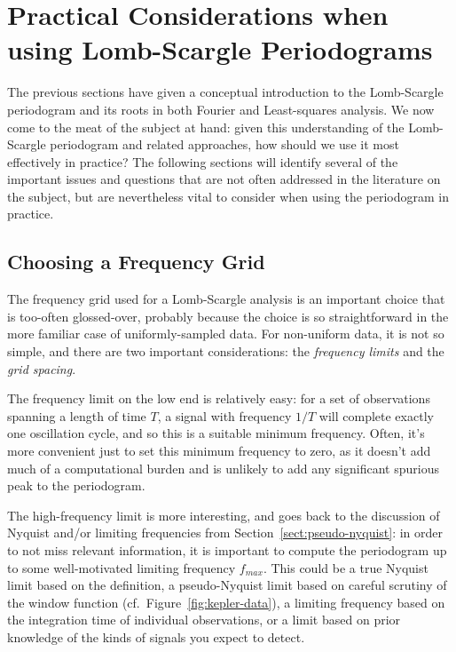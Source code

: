 \documentclass[preprint]{aastex}
\newcommand{\fig}[1]{Figure~\ref{fig:#1}}
\newcommand{\Sect}[1]{Section~\ref{sect:#1}}
\newcommand{\sect}[1]{\Sect{#1}}
\newcommand{\sectlabel}[1]{\label{sect:#1}}
\begin{document}
\section{Practical Considerations when using Lomb-Scargle Periodograms}
\sectlabel{practical-considerations}
The previous sections have given a conceptual introduction to the Lomb-Scargle
periodogram and its roots in both Fourier and Least-squares analysis.
We now come to the meat of the subject at hand:
given this understanding of the Lomb-Scargle periodogram and related
approaches, how should we use it most effectively in practice?
The following sections will identify several of the important issues and
questions that are not often addressed in the literature on the subject,
but are nevertheless vital to consider when using the periodogram in practice.

\subsection{Choosing a Frequency Grid}
\sectlabel{frequency-grid}
The frequency grid used for a Lomb-Scargle analysis is an important choice
that is too-often glossed-over, probably because the choice is so
straightforward in the more familiar case of uniformly-sampled data.
For non-uniform data, it is not so simple, and there are two important
considerations: the {\it frequency limits} and the {\it grid spacing}.

The frequency limit on the low end is relatively easy: for a set of observations
spanning a length of time $T$,
a signal with frequency $1/T$ will complete exactly one oscillation cycle,
and so this is a suitable minimum frequency.
Often, it's more convenient just to set this minimum frequency to zero, as it
doesn't add much of a computational burden and is unlikely to add any
significant spurious peak to the periodogram.

The high-frequency limit is more interesting, and goes back to the discussion
of Nyquist and/or limiting frequencies from \sect{pseudo-nyquist}:
in order to not miss relevant information, it is important to compute the
periodogram up to some well-motivated limiting frequency $f_{max}$. This could
be a true Nyquist limit based on the \citet{Eyer99} definition, a pseudo-Nyquist
limit based on careful scrutiny of the window function (cf.\ \fig{kepler-data}),
a limiting frequency based on the integration time of individual
observations, or a limit based on prior knowledge of the kinds of signals
you expect to detect.
\end{document}
